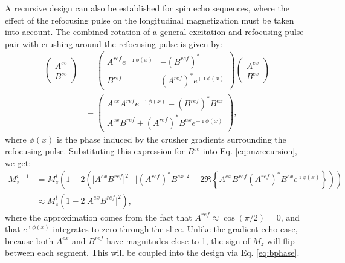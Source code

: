 \documentclass[11pt]{article}
\begin{document}
\par A recursive design can also be established for spin echo sequences, 
where the effect of the refocusing pulse on the longitudinal magnetization must be taken into account.
The combined rotation of a general excitation and refocusing pulse pair with crushing around the refocusing pulse is given by:
\begin{align}
\left(\begin{array}{c} A^{se} \\ B^{se} \end{array}\right) &= \left(\begin{array}{cc} A^{ref}e^{-\imath \phi(x)} & -(B^{ref})^* \\ B^{ref} & (A^{ref})^*e^{+\imath \phi(x)} \end{array}\right) \left(\begin{array}{cc} A^{ex} \\ B^{ex} \end{array}\right) \\
&= \left(\begin{array}{c} A^{ex}A^{ref}e^{-\imath \phi(x)} - (B^{ref})^*B^{ex} \\ A^{ex}B^{ref} + (A^{ref})^* B^{ex} e^{+\imath \phi(x)} \end{array}\right),
\end{align}
where $\phi(x)$ is the phase induced by the crusher gradients surrounding the refocusing pulse. 
Substituting this expression for $B^{se}$ into Eq. \ref{eq:mzrecursion}, we get:
\begin{align}
M_z^{i+1} &= M_z^i \left( 1 - 2 \left( \vert A^{ex} B^{ref} \vert^2 + \vert (A^{ref})^* B^{ex} \vert^2 + 2\Re \left\{ A^{ex} B^{ref} (A^{ref})^* B^{ex} e^{\imath \phi(x)} \right\} \right) \right) \\
&\approx M_z^i \left(1 - 2\vert A^{ex} B^{ref} \vert^2\right),
\end{align}
where the approximation comes from the fact that $A^{ref} \approx \cos\left(\pi/2\right) = 0$, 
and that $e^{\imath \phi(x)}$ integrates to zero through the slice. 
Unlike the gradient echo case,
because both $A^{ex}$ and $B^{ref}$ have magnitudes close to 1, 
the sign of $M_z$ will flip between each segment. 
This will be coupled into the design via Eq. \ref{eq:bphase}.
\end{document}

